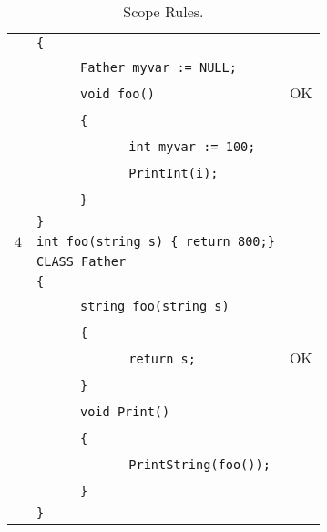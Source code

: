 \documentclass{article}
\begin{document}
\begin{table}[h]
\begin{tabular}{|l|l|l|}
     & \verb"{"                                    &    \\
     & ~ ~ ~ ~\verb"Father myvar := NULL;"         &    \\
     & ~ ~ ~ ~\verb"void foo()"                    & OK \\
     & ~ ~ ~ ~\verb"{"                             &    \\
     & ~ ~ ~ ~ ~ ~ ~ ~\verb"int myvar := 100;"     &    \\
     & ~ ~ ~ ~ ~ ~ ~ ~\verb"PrintInt(i);"          &    \\
     & ~ ~ ~ ~\verb"}"                             &    \\
     & \verb"}"                                    &    \\
\hline
 $4$ & \verb"int foo(string s) { return 800;}"    &    \\
     & \verb"CLASS Father"                        &    \\
     & \verb"{"                                   &    \\
     & ~ ~ ~ ~\verb"string foo(string s)"         &    \\
     & ~ ~ ~ ~\verb"{"                            &    \\
     & ~ ~ ~ ~ ~ ~ ~ ~\verb"return s;"            & OK \\
     & ~ ~ ~ ~\verb"}"                            &    \\
     & ~ ~ ~ ~\verb"void Print()"                 &    \\
     & ~ ~ ~ ~\verb"{"                            &    \\
     & ~ ~ ~ ~ ~ ~ ~ ~\verb"PrintString(foo());"  &    \\
     & ~ ~ ~ ~\verb"}"                            &    \\
     & \verb"}"                                   &    \\
\hline
\end{tabular}
\caption{Scope Rules.
\label{Table_Code_Examples_Scope_Rules}}
\end{table}
\newpage
\end{document}
